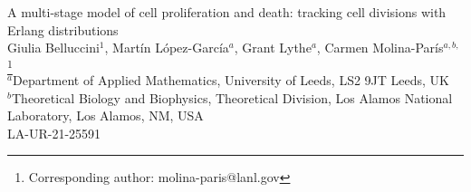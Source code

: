 \documentclass[10pt]{article}
\numberwithin{equation}{section}
\begin{document}



\begin{center}
    {\large A multi-stage model of cell proliferation and death: tracking cell divisions with Erlang distributions}\\
    $~$\\
    {\small Giulia Belluccini$^1$, Mart\'in L\'opez-Garc\'ia$^a$, Grant Lythe$^a$, Carmen Molina-Par\'is$^{a,b,}$\footnote{Corresponding author: molina-paris@lanl.gov}\\
    $~$\\
{\scriptsize $^a$Department of Applied Mathematics, University of Leeds, LS2 9JT Leeds, UK\\
$^b$Theoretical Biology and Biophysics,
Theoretical Division, Los Alamos National Laboratory, Los Alamos, NM, USA \\
LA-UR-21-25591}}

\end{center}



\begin{comment}
Insert your abstract here. Include keywords, PACS and mathematical
subject classification numbers as needed. {\bf NOTE: 150-250 words (see the website)}
\end{comment}
\end{document}
